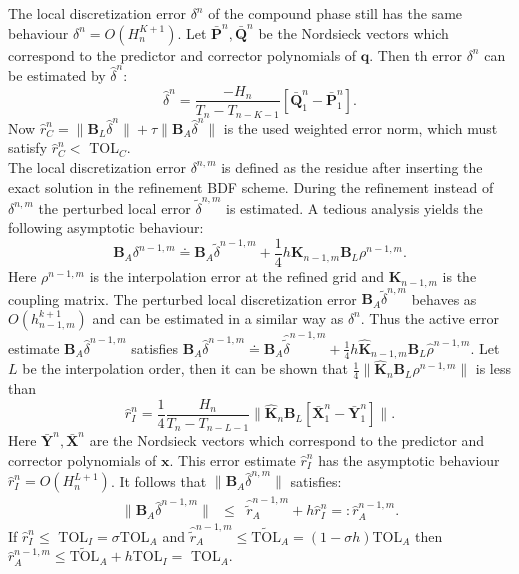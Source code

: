\documentclass{report}
\begin{document}
The local discretization error $\delta^n$ of the compound phase still has
the same behaviour $\delta^n = O(H_n^{K+1})$.
Let $\bar{\mathbf{P}}^n,\bar{\mathbf{Q}}^n$ be the Nordsieck vectors
which correspond to the predictor and corrector polynomials of $\mathbf{q}$.
Then th error $\delta^n$ can be estimated by $\hat{\delta}^n$:
\begin{equation}
\hat{\delta}^n = \frac{-H_n}{T_n - T_{n-K-1}} \left
[\bar{\mathbf{Q}}_{1}^{n}-\bar{\mathbf{P}}_{1}^{n} \right ].
\end{equation}
Now $\hat r_C^n = \|\mathbf{B}_L \hat{\delta}^n\| + \tau\|\mathbf{B}_A
\hat{\delta}^n\| $ is the used weighted error norm, which must satisfy
$\hat r_C^n <$ TOL$_C$.\\
The local discretization error $\delta^{n,m}$
is defined as the residue after inserting the exact solution
in the refinement BDF scheme.
During the refinement instead of $\delta^{n,m}$ the perturbed local error
$\tilde{\delta}^{n,m}$ is estimated.
A tedious analysis yields the following asymptotic behaviour:
\begin{equation}\label{deltarelation}
\mathbf{B}_A\delta^{n-1,m} \doteq
\mathbf{B}_A\tilde{\delta}^{n-1,m} + \frac{1}{4}h
\mathbf{K}_{n-1,m}\mathbf{B}_L\rho^{n-1,m}.
\end{equation}
Here $\rho^{n-1,m}$ is the interpolation error at the refined grid and
$\mathbf{K}_{n-1,m}$ is
the coupling matrix.
The perturbed local discretization error $\mathbf{B}_A\tilde{\delta}^{n,m}$ behaves as
$O(h_{n-1,m}^{k+1})$ and
can be estimated
in a similar way as $\delta^n$.
Thus the active error estimate $\mathbf{B}_A\hat\delta^{n-1,m}$
satisfies $\mathbf{B}_A\hat\delta^{n-1,m} \doteq
\mathbf{B}_A\hat{\tilde{\delta}}^{n-1,m} + \frac{1}{4}h
\hat{\mathbf{K}}_{n-1,m}\mathbf{B}_L\hat\rho^{n-1,m}$.
Let $L$ be the interpolation order, then it can be shown that
$\frac{1}{4}\|\hat{\mathbf{K}}_{n}\mathbf{B}_L\rho^{n-1,m}\|$ is less than
\begin{equation}
\hat{r}_I^{n} = \frac{1}{4}\frac{H_n}{T_n - T_{n-L-1}}
\|\hat{\mathbf{K}}_{n}\mathbf{B}_L\left[\bar{\mathbf{X}}_{1}^n-\bar{\mathbf{Y}}_{1}^n\right]
\|.
\end{equation}
Here $\bar{\mathbf{Y}}^n,\bar{\mathbf{X}}^n$ are the Nordsieck vectors
which correspond to the predictor and corrector polynomials of $\mathbf{x}$.
This error estimate $\hat{r}_I^n$ has the asymptotic behaviour
$\hat{r}_I^{n} = O(H_n^{L+1})$.
It follows that
$\|\mathbf{B}_A\hat{\delta}^{n,m}\|$ satisfies:
\begin{equation}\begin{array}{rcl}
\|\mathbf{B}_A\hat{\delta}^{n-1,m}\| &\leq& \hat{\tilde{r}}_A^{n-1,m} +
h\hat{r}_I^{n} =: \hat{r}_A^{n-1,m}.
\end{array}\end{equation}
If $\hat{r}_I^{n} \leq $ TOL$_I = \sigma$TOL$_A$ and
$\hat{\tilde{r}}_A^{n-1,m} \leq \tilde{\mbox{TOL}}_A = (1-\sigma h)$TOL$_A$
then $\hat{r}_A^{n-1,m} \leq \tilde{\mbox{TOL}}_A + h$TOL$_I =$ TOL$_A$.
\end{document}
